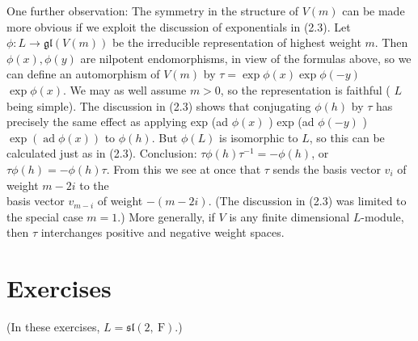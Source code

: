 \documentclass[10pt]{article}
\begin{document}
One further observation: The symmetry in the structure of $V(m)$ can be made more obvious if we exploit the discussion of exponentials in (2.3). Let $\phi: L \rightarrow \mathfrak{g l}(V(m))$ be the irreducible representation of highest weight $m$. Then $\phi(x), \phi(y)$ are nilpotent endomorphisms, in view of the formulas above, so we can define an automorphism of $V(m)$ by $\tau=\exp \phi(x) \exp \phi(-y)$ $\exp \phi(x)$. We may as well assume $m>0$, so the representation is faithful ( $L$ being simple). The discussion in (2.3) shows that conjugating $\phi(h)$ by $\tau$ has precisely the same effect as applying exp (ad $\phi(x)$ ) exp (ad $\phi(-y)$ ) $\exp (\operatorname{ad} \phi(x))$ to $\phi(h)$. But $\phi(L)$ is isomorphic to $L$, so this can be calculated just as in (2.3). Conclusion: $\tau \phi(h) \tau^{-1}=-\phi(h)$, or $\tau \phi(h)=-\phi(h) \tau$. From this we see at once that $\tau$ sends the basis vector $v_{i}$ of weight $m-2 i$ to the\\
basis vector $v_{m-i}$ of weight $-(m-2 i)$. (The discussion in (2.3) was limited to the special case $m=1$.) More generally, if $V$ is any finite dimensional $L$-module, then $\tau$ interchanges positive and negative weight spaces.

\section*{Exercises}
(In these exercises, $L=\mathfrak{s l}(2, \mathrm{~F})$.)
\end{document}
